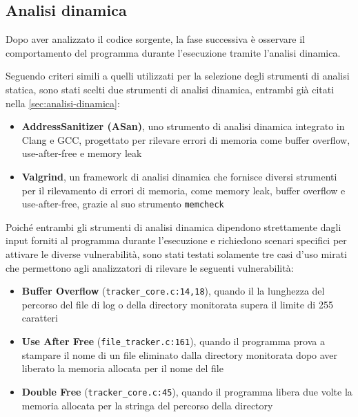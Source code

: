 \subsection*{Analisi dinamica}
Dopo aver analizzato il codice sorgente, la fase successiva è osservare il
comportamento del programma durante l'esecuzione tramite l'analisi dinamica.

Seguendo criteri simili a quelli utilizzati per la selezione degli strumenti di
analisi statica, sono stati scelti due strumenti di analisi dinamica, entrambi
già citati nella \autoref{sec:analisi-dinamica}:
\begin{itemize}
  \item \textbf{AddressSanitizer (ASan)}, uno strumento di analisi dinamica integrato
    in Clang e GCC, progettato per rilevare errori di memoria come buffer
    overflow, use-after-free e memory leak

  \item \textbf{Valgrind}, un framework di analisi dinamica che fornisce diversi
    strumenti per il rilevamento di errori di memoria, come memory leak, buffer overflow
    e use-after-free, grazie al suo strumento \texttt{memcheck}
\end{itemize}

\noindent
Poiché entrambi gli strumenti di analisi dinamica dipendono strettamente dagli
input forniti al programma durante l'esecuzione e richiedono scenari specifici
per attivare le diverse vulnerabilità, sono stati testati solamente tre casi d'uso
mirati che permettono agli analizzatori di rilevare le seguenti vulnerabilità:
\begin{itemize}
  \item \textbf{Buffer Overflow} (\texttt{tracker\_core.c:14,18}), quando il la
    lunghezza del percorso del file di log o della directory monitorata supera
    il limite di 255 caratteri

  \item \textbf{Use After Free} (\texttt{file\_tracker.c:161}), quando il
    programma prova a stampare il nome di un file eliminato dalla directory
    monitorata dopo aver liberato la memoria allocata per il nome del file

  \item \textbf{Double Free} (\texttt{tracker\_core.c:45}), quando il programma
    libera due volte la memoria allocata per la stringa del percorso della
    directory
\end{itemize}

